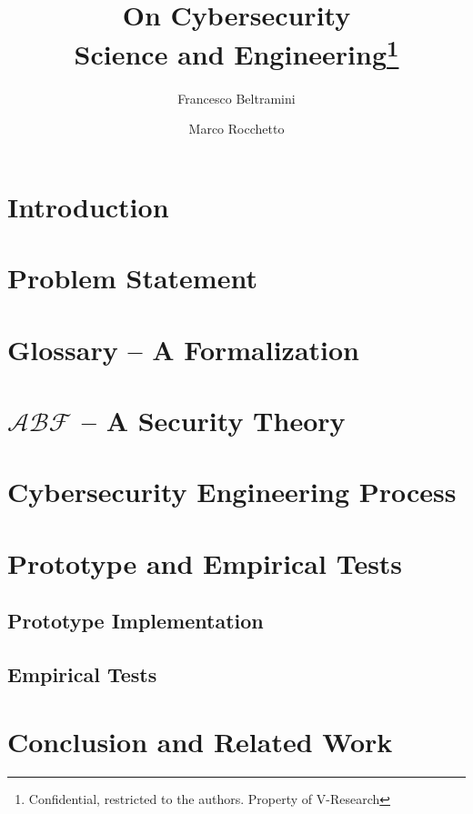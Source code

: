 \documentclass{article}
\date{}                     %
\theoremstyle{definition}
\theoremstyle{corollary}
\theoremstyle{lemma}
\theoremstyle{theorem}
\theoremstyle{theorem}
\newcommand{\assertionRegion}{\mathcal{A}}
\newcommand{\behaviorRegion}{\mathcal{B}}
\newcommand{\factRegion}{\mathcal{F}}
\begin{document}
\title{On Cybersecurity\\Science and Engineering\footnote{Confidential, restricted to the authors. Property of V-Research}}
\author[1]{Francesco Beltramini}
\author[1]{Marco Rocchetto}

\maketitle

\begin{abstract}
 
\end{abstract}
\newpage

\section{Introduction}\label{sec:intro}


\section{Problem Statement}\label{sec:problem}


\section{Glossary -- A Formalization}\label{sec:glossary}


\section{$\assertionRegion\behaviorRegion\factRegion$ -- A Security Theory}\label{sec:theory}


\section{Cybersecurity Engineering Process}\label{sec:process}


\section{Prototype and Empirical Tests}\label{sec:prototest}
\subsection{Prototype Implementation}\label{sec:tool}
\subsection{Empirical Tests}\label{sec:tests}

\section{Conclusion and Related Work}\label{sec:related}

\printbibliography
\end{document}
